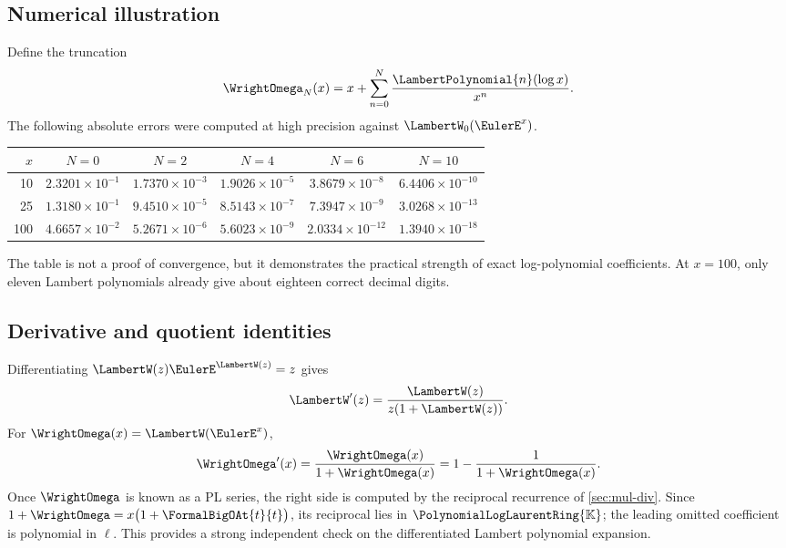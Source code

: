 \documentclass[11pt,oneside]{article}
\numberwithin{equation}{section}
\theoremstyle{definition}
\newcommand{\K}{\mathbb{K}}
\newcommand{\PL}{\PolynomialLogLaurentRing{\K}}
\begin{document}
\subsection{Numerical illustration}

Define the truncation
\begin{equation}\label{eq:omega-N}
  \WrightOmega_N(x)=x+\sum_{n=0}^N\frac{\LambertPolynomial{n}(\log x)}{x^n}.
\end{equation}
The following absolute errors were computed at high precision against
\(\LambertW_0(\EulerE^x)\).

\begin{center}
\begin{tabular}{@{}rccccc@{}}
\toprule
\(x\)&\(N=0\)&\(N=2\)&\(N=4\)&\(N=6\)&\(N=10\)\\
\midrule
10  &\(2.3201\!\times10^{-1}\)&\(1.7370\!\times10^{-3}\)&\(1.9026\!\times10^{-5}\)&\(3.8679\!\times10^{-8}\)&\(6.4406\!\times10^{-10}\)\\
25  &\(1.3180\!\times10^{-1}\)&\(9.4510\!\times10^{-5}\)&\(8.5143\!\times10^{-7}\)&\(7.3947\!\times10^{-9}\)&\(3.0268\!\times10^{-13}\)\\
100 &\(4.6657\!\times10^{-2}\)&\(5.2671\!\times10^{-6}\)&\(5.6023\!\times10^{-9}\)&\(2.0334\!\times10^{-12}\)&\(1.3940\!\times10^{-18}\)\\
\bottomrule
\end{tabular}
\end{center}

The table is not a proof of convergence, but it demonstrates the practical
strength of exact log-polynomial coefficients.  At \(x=100\), only eleven
Lambert polynomials already give about eighteen correct decimal digits.

\subsection{Derivative and quotient identities}

Differentiating \(\LambertW(z)\EulerE^{\LambertW(z)}=z\) gives
\begin{equation}\label{eq:W-derivative}
  \LambertW'(z)=\frac{\LambertW(z)}{z(1+\LambertW(z))}.
\end{equation}
For \(\WrightOmega(x)=\LambertW(\EulerE^x)\),
\begin{equation}\label{eq:omega-derivative}
  \WrightOmega'(x)=\frac{\WrightOmega(x)}{1+\WrightOmega(x)}
  =1-\frac{1}{1+\WrightOmega(x)}.
\end{equation}
Once \(\WrightOmega\) is known as a PL series, the right side is computed by the
reciprocal recurrence of \cref{sec:mul-div}.  Since
\(1+\WrightOmega=x\bigl(1+\FormalBigOAt{t}{t}\bigr)\), its reciprocal lies in \(\PL\);
the leading omitted coefficient is polynomial in \(\ell\).
This provides a strong independent check on the differentiated Lambert
polynomial expansion.
\end{document}

